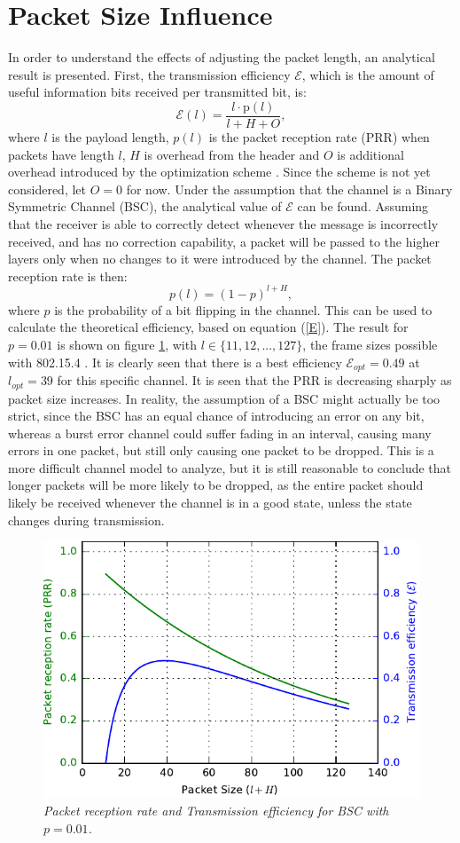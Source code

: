 \section{Packet Size Influence}\label{sec:pacSizeInf}
In order to understand the effects of adjusting the packet length, an analytical result is presented. First, the transmission efficiency $\mathcal{E}$, which is the amount of useful information bits received per transmitted bit, is:
\begin{equation}
\mathcal{E}(l) = \frac{l\cdot \text{p}(l)}{l + H + O},\label{E}
\end{equation}
where $l$ is the payload length, $p(l)$ is the packet reception rate (PRR) when packets have length $l$, $H$ is overhead from the header and $O$ is additional overhead introduced by the optimization scheme \cite{DPLCpaper}. Since the scheme is not yet considered, let $O=0$ for now. Under the assumption that the channel is a Binary Symmetric Channel (BSC), the analytical value of $\mathcal{E}$ can be found. Assuming that the receiver is able to correctly detect whenever the message is incorrectly received, and has no correction capability, a packet will be passed to the higher layers only when no changes to it were introduced by the channel. The packet reception rate is then:
\begin{equation}
p(l) = (1 - p)^{l+H},
\end{equation}
where $p$ is the probability of a bit flipping in the channel. This can be used to calculate the theoretical efficiency, based on equation (\ref{E}). The result for $p=0.01$ is shown on figure \ref{fig:BSC}, with $l\in \{11,12,...,127\}$, the frame sizes possible with 802.15.4 \cite{CC2420}. It is clearly seen that there is a best efficiency $\mathcal{E}_{opt} = 0.49$ at $l_{opt} = 39$ for this specific channel. It is seen that the PRR is decreasing sharply as packet size increases. In reality, the assumption of a BSC might actually be too strict, since the BSC has an equal chance of introducing an error on any bit, whereas a burst error channel could suffer fading in an interval, causing many errors in one packet, but still only causing one packet to be dropped. This is a more difficult channel model to analyze, but it is still reasonable to conclude that longer packets will be more likely to be dropped, as the entire packet should likely be received whenever the channel is in a good state, unless the state changes during transmission.
\begin{figure}
\centering
\includegraphics[scale=1]{figs/simFig_BSC001.pdf} 
\caption{\textit{Packet reception rate and Transmission efficiency for BSC with $p=0.01$.}\label{fig:BSC}}
\end{figure}